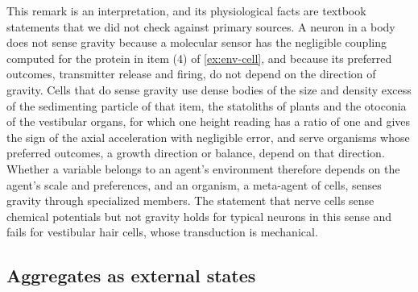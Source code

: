 \begin{remark}\label{rem:env-neurons}
This remark is an interpretation, and its physiological facts are textbook statements that we did not check against primary sources. A neuron in a body does not sense gravity because a molecular sensor has the negligible coupling computed for the protein in item (4) of \cref{ex:env-cell}, and because its preferred outcomes, transmitter release and firing, do not depend on the direction of gravity. Cells that do sense gravity use dense bodies of the size and density excess of the sedimenting particle of that item, the statoliths of plants and the otoconia of the vestibular organs, for which one height reading has a ratio of one and gives the sign of the axial acceleration with negligible error, and serve organisms whose preferred outcomes, a growth direction or balance, depend on that direction. Whether a variable belongs to an agent's environment therefore depends on the agent's scale and preferences, and an organism, a meta-agent of cells, senses gravity through specialized members. The statement that nerve cells sense chemical potentials but not gravity holds for typical neurons in this sense and fails for vestibular hair cells, whose transduction is mechanical.
\end{remark}

\subsection{Aggregates as external states}\label{sup:env-aggregates-as-external-states}

